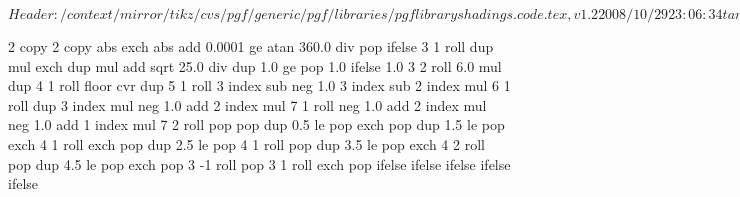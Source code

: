 %
%
%

\ProvidesFileRCS[v\pgfversion] $Header: /context/mirror/tikz/cvs/pgf/generic/pgf/libraries/pgflibraryshadings.code.tex,v 1.2 2008/10/29 23:06:34 tantau Exp $


%
%

{\pgfpoint{-50bp}{-50bp}}
{\pgfpoint{50bp}{50bp}}
{}
{ %
  2 copy %
  2 copy abs exch abs add 0.0001 ge 
  {atan 360.0 div} %
  { pop } %
  ifelse  %
  3 1 roll %
  dup mul %
  exch dup mul %
  add sqrt %
  25.0 div %
  dup 1.0 ge %
  { pop 1.0 }{} ifelse %
  1.0 %
  3 2 roll 6.0 mul dup 4 1 roll %
  floor cvr  %
  dup 5 1 roll %
  3 index sub neg %
  1.0 3 index sub %
  2 index mul %
  6 1 roll %
  dup 3 index mul neg 1.0 add %
  2 index mul %
  7 1 roll %
  neg 1.0 add %
  2 index mul neg 1.0  add %
  1 index mul %
  7 2 roll %
  pop pop %
  dup 0.5 le %
  { %
    pop exch pop
  }
  { dup 1.5 le %
    { %
      pop exch 4 1 roll exch pop
    }
    { dup 2.5 le %
      { %
        pop 4 1 roll pop
      }
      { dup 3.5 le %
        { %
          pop exch 4 2 roll pop
        }
        { dup 4.5 le %
          { %
            pop exch pop 3 -1 roll
          }
          { %
            pop 3 1 roll exch pop
          }
          ifelse
        }
        ifelse %
      }
      ifelse %
    }
    ifelse %
  }
  ifelse %
}

